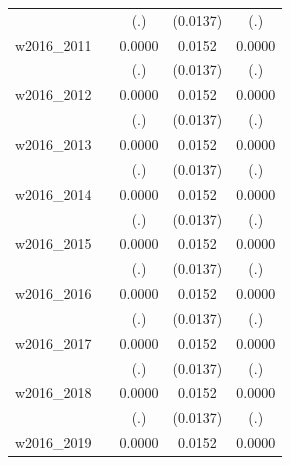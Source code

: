 \begin{table}[htbp]
\begin{tabular}{l*{4}{c}}
            &                     &         (.)         &    (0.0137)         &         (.)         \\
[1em]
w2016\_2011  &                     &      0.0000         &      0.0152         &      0.0000         \\
            &                     &         (.)         &    (0.0137)         &         (.)         \\
[1em]
w2016\_2012  &                     &      0.0000         &      0.0152         &      0.0000         \\
            &                     &         (.)         &    (0.0137)         &         (.)         \\
[1em]
w2016\_2013  &                     &      0.0000         &      0.0152         &      0.0000         \\
            &                     &         (.)         &    (0.0137)         &         (.)         \\
[1em]
w2016\_2014  &                     &      0.0000         &      0.0152         &      0.0000         \\
            &                     &         (.)         &    (0.0137)         &         (.)         \\
[1em]
w2016\_2015  &                     &      0.0000         &      0.0152         &      0.0000         \\
            &                     &         (.)         &    (0.0137)         &         (.)         \\
[1em]
w2016\_2016  &                     &      0.0000         &      0.0152         &      0.0000         \\
            &                     &         (.)         &    (0.0137)         &         (.)         \\
[1em]
w2016\_2017  &                     &      0.0000         &      0.0152         &      0.0000         \\
            &                     &         (.)         &    (0.0137)         &         (.)         \\
[1em]
w2016\_2018  &                     &      0.0000         &      0.0152         &      0.0000         \\
            &                     &         (.)         &    (0.0137)         &         (.)         \\
[1em]
w2016\_2019  &                     &      0.0000         &      0.0152         &      0.0000         \\

\end{tabular}
\end{table}
